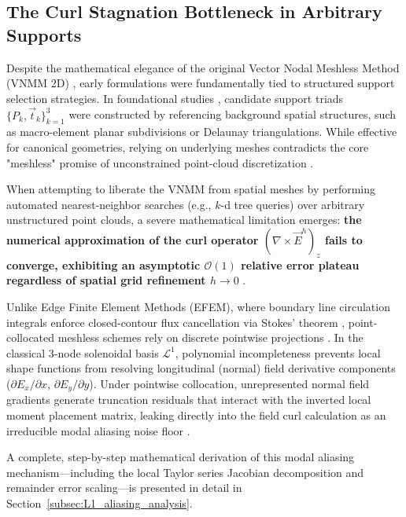 \documentclass[preprint,12pt]{elsarticle}
\begin{document}
\subsection{The Curl Stagnation Bottleneck in Arbitrary Supports}
\label{subsec:curl_stagnation_bottleneck}

Despite the mathematical elegance of the original Vector Nodal Meshless Method (VNMM 2D) \cite{ortiz2021nodal, ortiz2023tese}, early formulations were fundamentally tied to structured support selection strategies. In foundational studies \cite{ortiz2021nodal, ortiz2023tese, goncalves2023vector}, candidate support triads $\{P_k, \vec{t}_k\}_{k=1}^3$ were constructed by referencing background spatial structures, such as macro-element planar subdivisions or Delaunay triangulations. While effective for canonical geometries, relying on underlying meshes contradicts the core "meshless" promise of unconstrained point-cloud discretization \cite{liu2009mesh, goncalves2025tese}.

When attempting to liberate the VNMM from spatial meshes by performing automated nearest-neighbor searches (e.g., $k$-d tree queries) over arbitrary unstructured point clouds, a severe mathematical limitation emerges: \textbf{the numerical approximation of the curl operator $(\nabla \times \vec{E}^h)_z$ fails to converge, exhibiting an asymptotic $\mathcal{O}(1)$ relative error plateau regardless of spatial grid refinement $h \to 0$} \cite{goncalves2025tese}.

Unlike Edge Finite Element Methods (EFEM), where boundary line circulation integrals enforce closed-contour flux cancellation via Stokes' theorem \cite{nedelec1980mixed, monk2003finite}, point-collocated meshless schemes rely on discrete pointwise projections \cite{goncalves2025tese}. In the classical 3-node solenoidal basis $\mathcal{L}^1$, polynomial incompleteness prevents local shape functions from resolving longitudinal (normal) field derivative components ($\partial E_x/\partial x$, $\partial E_y/\partial y$). Under pointwise collocation, unrepresented normal field gradients generate truncation residuals that interact with the inverted local moment placement matrix, leaking directly into the field curl calculation as an irreducible modal aliasing noise floor \cite{li2007meshfree, liu2009mesh}.

A complete, step-by-step mathematical derivation of this modal aliasing mechanism---including the local Taylor series Jacobian decomposition and remainder error scaling---is presented in detail in Section~\ref{subsec:L1_aliasing_analysis}.
\end{document}
